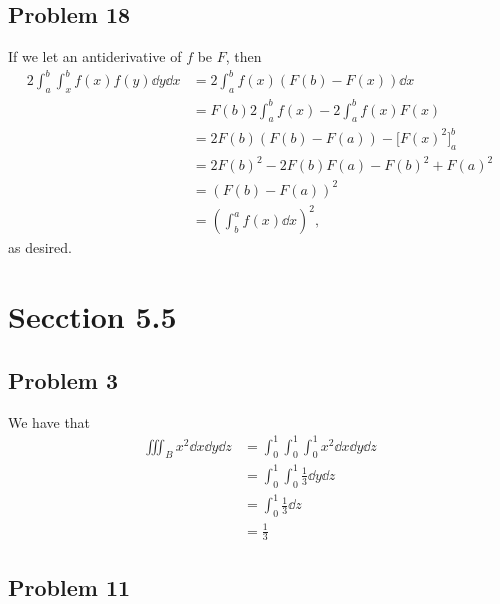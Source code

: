 \documentclass[11pt]{article}
\begin{document}

\subsection*{Problem 18}

If we let an antiderivative of $f$ be $F$, then
\begin{align*}
	2\int_{a}^{b} \int_{x}^{b} f(x) f(y) \dd{y} \dd{x} &= 2\int_{a}^{b} f(x) (F(b) - F(x)) \dd{x} \\
	&= F(b) 2\int_{a}^{b} f(x) - 2\int_{a}^{b} f(x) F(x) \\
	&= 2F(b) (F(b) - F(a)) - \Big[ F(x)^{2} \Big]_{a}^{b} \\
	&= 2F(b)^{2} - 2 F(b) F(a) - F(b)^{2} + F(a)^{2} \\
	&= (F(b) - F(a))^{2} \\
	&= \left( \int_{b}^{a} f(x) \dd{x} \right)^{2},
\end{align*}
as desired.


\section{Secction 5.5}


\subsection*{Problem 3}

We have that
\begin{align*}
	\iiint_{B} x^{2} \dd{x} \dd{y} \dd{z} &= \int_{0}^{1} \int_{0}^{1} \int_{0}^{1} x^{2} \dd{x} \dd{y} \dd{z} \\
	&= \int_{0}^{1} \int_{0}^{1} \frac{1}{3} \dd{y} \dd{z} \\
	&= \int_{0}^{1} \frac{1}{3} \dd{z} \\
	&= \boxed{\frac{1}{3}}
\end{align*}


\subsection*{Problem 11}
\end{document}
